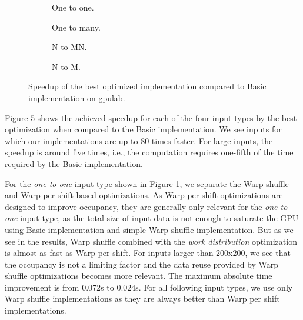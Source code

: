 \begin{figure}[ht]
	\centering	
	\begin{subfigure}{0.4\textwidth}
		\centering
		\def\svgwidth{\textwidth}
		
		\caption{One to one.}
		\label{fig:definition_based_speedup_one_to_one}
	\end{subfigure}
	\begin{subfigure}{0.4\textwidth}
		\centering
		\def\svgwidth{\textwidth}
		
		\caption{One to many.}
		\label{fig:definition_based_speedup_one_to_many}
	\end{subfigure}
	\begin{subfigure}{0.4\textwidth}
		\centering
		\def\svgwidth{\textwidth}
		
		\caption{N to MN.}
		\label{fig:definition_based_speedup_n_to_mn}
	\end{subfigure}
	\begin{subfigure}{0.4\textwidth}
		\centering
		\def\svgwidth{\textwidth}
		
		\caption{N to M.}
		\label{fig:definition_based_speedup_n_to_m}
	\end{subfigure}
	\caption{Speedup of the best optimized implementation compared to Basic implementation on gpulab.}
	\label{fig:definition_based_speedup}
\end{figure}

Figure \ref{fig:definition_based_speedup} shows the achieved speedup for each of the four input types by the best optimization when compared to the Basic implementation. We see inputs for which our implementations are up to 80 times faster. For large inputs, the speedup is around five times, i.e., the computation requires one-fifth of the time required by the Basic implementation.

For the \textit{one-to-one} input type shown in Figure \ref{fig:definition_based_speedup_one_to_one}, we separate the Warp shuffle and Warp per shift based optimizations. As Warp per shift optimizations are designed to improve occupancy, they are generally only relevant for the \textit{one-to-one} input type, as the total size of input data is not enough to saturate the GPU using Basic implementation and simple Warp shuffle implementation. But as we see in the results, Warp shuffle combined with the \textit{work distribution} optimization is almost as fast as Warp per shift. For inputs larger than 200x200, we see that the occupancy is not a limiting factor and the data reuse provided by Warp shuffle optimizations becomes more relevant. The maximum absolute time improvement is from $0.072$s to $0.024$s. For all following input types, we use only Warp shuffle implementations as they are always better than Warp per shift implementations.

